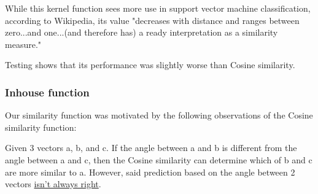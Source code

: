 \documentclass{article}
\begin{document}
While this kernel function sees more use in support vector machine classification, according to Wikipedia, its value "decreases with distance and ranges between zero...and one...(and therefore has) a ready interpretation as a similarity measure." 

Testing shows that its performance was slightly worse than Cosine similarity.

\subsubsection{Inhouse function}

Our similarity function was motivated by the following observations of the Cosine similarity function:

Given 3 vectors a, b, and c. If the angle between a and b is different from the angle between a and c, then the Cosine similarity can determine which of b and c are more similar to a. However, said prediction based on the angle between 2 vectors \underline{isn't always right}.
\end{document}
